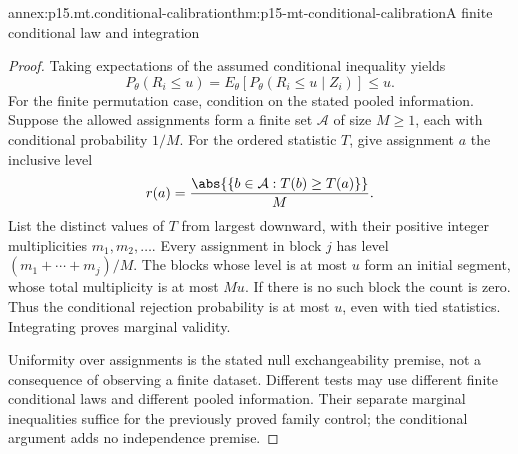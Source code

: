 \begin{annexitem}{annex:p15.mt.conditional-calibration}{thm:p15-mt-conditional-calibration}{A finite conditional law and integration}
\begin{proof}
Taking expectations of the assumed conditional inequality yields
\[
 P_\theta(R_i\leq u)
   =E_\theta[P_\theta(R_i\leq u\mid Z_i)]\leq u.
\]
For the finite permutation case, condition on the stated pooled
information. Suppose the allowed assignments form a finite set
\(\mathcal A\) of size \(M\geq1\), each with conditional probability
\(1/M\). For the ordered statistic \(T\), give assignment \(a\)
the inclusive level
\[
       r(a)=\frac{\abs{\{b\in\mathcal A:T(b)\geq T(a)\}}}{M}.
\]
List the distinct values of \(T\) from largest downward, with their
positive integer multiplicities \(m_1,m_2,\ldots\).
Every assignment in block \(j\) has level
\((m_1+\cdots+m_j)/M\). The blocks whose level is at most \(u\)
form an initial segment, whose total multiplicity is at most \(Mu\).
If there is no such block the count is zero. Thus the conditional
rejection probability is at most \(u\), even with tied statistics.
Integrating proves marginal validity.

Uniformity over assignments is the stated null exchangeability premise,
not a consequence of observing a finite dataset. Different tests may
use different finite conditional laws and different pooled information.
Their separate marginal inequalities suffice for the previously proved
family control; the conditional argument adds no independence premise.
\end{proof}
\end{annexitem}

